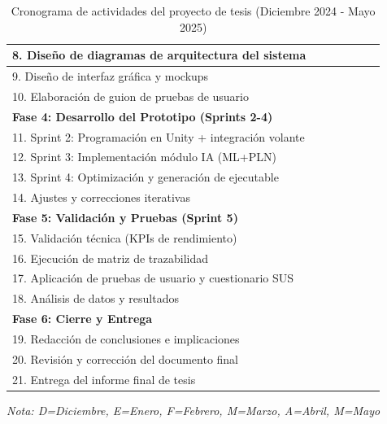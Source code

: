 \begin{table}[H]
\begin{tabular}{|l|c|c|c|c|c|c|}
\hline
8. Diseño de diagramas de arquitectura del sistema & & & \cellcolor{gray!50} & & & \\
\hline
9. Diseño de interfaz gráfica y mockups & & & \cellcolor{gray!50} & & & \\
\hline
10. Elaboración de guion de pruebas de usuario & & & \cellcolor{gray!50} & & & \\
\hline
\multicolumn{7}{|l|}{\cellcolor{gray!20}\textbf{Fase 4: Desarrollo del Prototipo (Sprints 2-4)}} \\
\hline
11. Sprint 2: Programación en Unity + integración volante & & & \cellcolor{gray!50} & \cellcolor{gray!50} & & \\
\hline
12. Sprint 3: Implementación módulo IA (ML+PLN) & & & & \cellcolor{gray!50} & & \\
\hline
13. Sprint 4: Optimización y generación de ejecutable & & & & \cellcolor{gray!50} & \cellcolor{gray!50} & \\
\hline
14. Ajustes y correcciones iterativas & & & & & \cellcolor{gray!50} & \\
\hline
\multicolumn{7}{|l|}{\cellcolor{gray!20}\textbf{Fase 5: Validación y Pruebas (Sprint 5)}} \\
\hline
15. Validación técnica (KPIs de rendimiento) & & & & & \cellcolor{gray!50} & \\
\hline
16. Ejecución de matriz de trazabilidad & & & & & \cellcolor{gray!50} & \\
\hline
17. Aplicación de pruebas de usuario y cuestionario SUS & & & & & \cellcolor{gray!50} & \\
\hline
18. Análisis de datos y resultados & & & & & & \cellcolor{gray!50} \\
\hline
\multicolumn{7}{|l|}{\cellcolor{gray!20}\textbf{Fase 6: Cierre y Entrega}} \\
\hline
19. Redacción de conclusiones e implicaciones & & & & & & \cellcolor{gray!50} \\
\hline
20. Revisión y corrección del documento final & & & & & & \cellcolor{gray!50} \\
\hline
21. Entrega del informe final de tesis & & & & & & \cellcolor{gray!50} \\
\hline
\end{tabular}
\caption{Cronograma de actividades del proyecto de tesis (Diciembre 2024 - Mayo 2025)}
\label{tab:cronograma}
\end{table}

\vspace{2mm}
\scriptsize{\textit{Nota: D=Diciembre, E=Enero, F=Febrero, M=Marzo, A=Abril, M=Mayo}}

